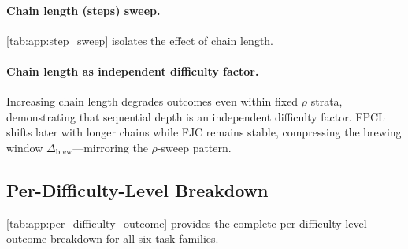 \paragraph{Chain length (steps) sweep.}

\cref{tab:app:step_sweep} isolates the effect of chain length.

\begin{table}[H]
\centering
\caption{Outcome distribution and layer-position statistics as a function of chain length (steps) for the Computing task (Qwen2.5-Coder-7B, pooled over all $\rho$).}
\label{tab:app:step_sweep}
\end{table}

\paragraph{Chain length as independent difficulty factor.}
Increasing chain length degrades outcomes even within fixed $\rho$ strata, demonstrating that sequential depth is an independent difficulty factor.
FPCL shifts later with longer chains while FJC remains stable, compressing the brewing window $\Delta_{\mathrm{brew}}$---mirroring the $\rho$-sweep pattern.


\subsection{Per-Difficulty-Level Breakdown}
\label{app:subsec:per_difficulty_breakdown}

\cref{tab:app:per_difficulty_outcome} provides the complete per-difficulty-level outcome breakdown for all six task families.


